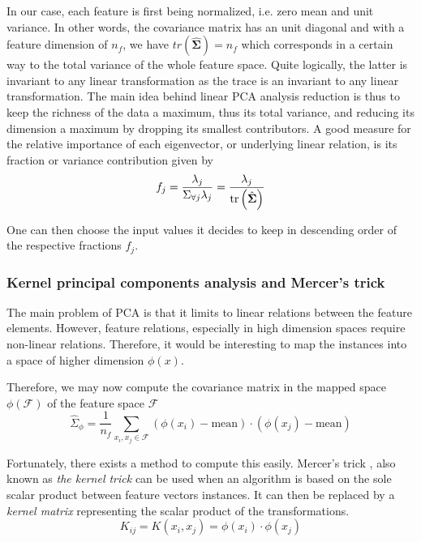 In our case, each feature is first being normalized, i.e. zero mean and unit variance. In other words, the covariance matrix has an unit diagonal and with a feature dimension of $n_f$, we have $tr(\hat{\mathbf{\Sigma}})=n_f$ which corresponds in a certain way to the total variance of the whole feature space. Quite logically, the latter is invariant to any linear transformation as the trace is an invariant to any linear transformation. The main idea behind linear PCA analysis reduction is thus to keep the richness of the data a maximum, thus its total variance, and reducing its dimension a maximum by dropping its smallest contributors. A good measure for the relative importance of each eigenvector, or underlying linear relation, is its fraction or variance contribution given by
\begin{equation}
f_j = \frac{\lambda_j}{\Sigma_{\forall j}\lambda_j} = \frac{\lambda_j}{\operatorname{tr}\left(\hat{\mathbf{\Sigma}}\right)}
\end{equation}

One can then choose the input values it decides to keep in descending order of the respective fractions $f_j$.

\subsubsection{Kernel principal components analysis and Mercer's trick}
The main problem of PCA is that it limits to linear relations between the feature elements. However, feature relations, especially in high dimension spaces require non-linear relations. Therefore, it would be interesting to map the instances into a space of higher dimension $\phi(x)$.

Therefore, we may now compute the covariance matrix in the mapped space $\phi\left( \mathcal{F} \right)$ of the feature space $\mathcal{F}$
\begin{equation}
    \hat{\Sigma}_{\phi} = \frac{1}{n_f} \sum_{x_i,x_j \in \mathcal{F}} \left( \phi(x_i) - \mathrm{mean} \right) \cdot \left( \phi(x_j) - \mathrm{mean} \right)
\end{equation}

Fortunately, there exists a method to compute this easily. Mercer's trick \cite{Minh2006MercersSmoothing}, also known as \emph{the kernel trick} can be used when an algorithm is based on the sole scalar product between feature vectors instances. It can then be replaced by a \emph{kernel matrix} representing the scalar product of the transformations.
\begin{equation}
    K_{ij} = K(x_i,x_j) = \phi(x_i) \cdot \phi(x_j)
\end{equation}

